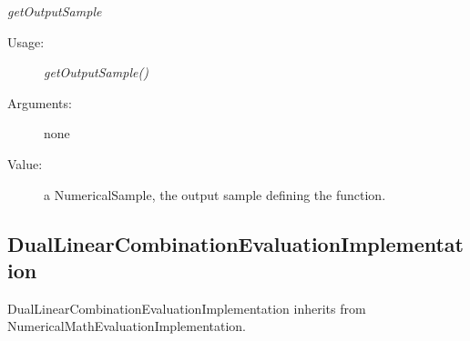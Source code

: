 \begin{description}
\begin{description}
\item \textit{getOutputSample}
\begin{description}
\item[Usage:] \textit{getOutputSample()}
\item[Arguments:] none
\item[Value:] a NumericalSample, the output sample defining the function.
\end{description}
\bigskip

\end{description}

\end{description}


\newpage
\subsection{DualLinearCombinationEvaluationImplementation}

DualLinearCombinationEvaluationImplementation inherits from NumericalMathEvaluationImplementation.

